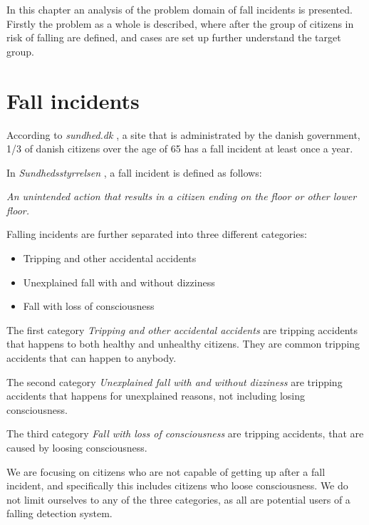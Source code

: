 \label{preliminaries:problemanalysis}

In this chapter an analysis of the problem domain of fall incidents is presented. Firstly the problem as a whole is described, where after the group of citizens in risk of falling are defined, and cases are set up further understand the target group.

\section{Fall incidents}
According to \textit{sundhed.dk} \cite{SundhedFald}, a site that is administrated by the danish government, 1/3 of danish citizens over the age of 65 has a fall incident at least once a year.

In \textit{Sundhedsstyrrelsen} \cite{Sundhedsstyrrelsen:Faldpatienter}, a fall incident is defined as follows:

\begin{center}
    \textit{An unintended action that results in a citizen ending on the floor or other lower floor.}
\end{center}

Falling incidents are further separated into three different categories:
\begin{itemize}
    \item Tripping and other accidental accidents
    \item Unexplained fall with and without dizziness
    \item Fall with loss of consciousness
\end{itemize}


The first category \textit{Tripping and other accidental accidents} are tripping accidents that happens to both healthy and unhealthy citizens. They are common tripping accidents that can happen to anybody.

The second category \textit{Unexplained fall with and without dizziness} are tripping accidents that happens for unexplained reasons, not including losing  consciousness.

The third category \textit{Fall with loss of consciousness} are tripping accidents, that are caused by loosing consciousness.

We are focusing on citizens who are not capable of getting up after a fall incident, and specifically this includes citizens who loose consciousness. We do not limit ourselves to any of the three categories, as all are potential users of a falling detection system.


